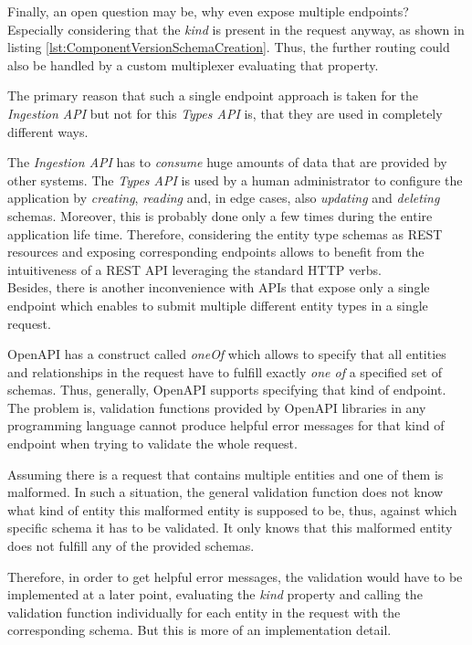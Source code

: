 Finally, an open question may be, why even expose multiple endpoints? Especially considering that the \emph{kind} is present in the request anyway, as shown in listing \ref{lst:ComponentVersionSchemaCreation}. Thus, the further routing could also be handled by a custom multiplexer evaluating that property.\par
The primary reason that such a single endpoint approach is taken for the \emph{Ingestion API} but not for this \emph{Types API} is, that they are used in completely different ways.\par
The \emph{Ingestion API} has to \emph{consume} huge amounts of data that are provided by other systems. The \emph{Types API} is used by a human administrator to configure the application by \emph{creating}, \emph{reading} and, in edge cases, also \emph{updating} and \emph{deleting} schemas. Moreover, this is probably done only a few times during the entire application life time. Therefore, considering the entity type schemas as REST resources and exposing corresponding endpoints allows to benefit from the intuitiveness of a REST API leveraging the standard HTTP verbs.\\

Besides, there is another inconvenience with APIs that expose only a single endpoint which enables to submit multiple different entity types in a single request.\par 
OpenAPI has a construct called \emph{oneOf} which allows to specify that all entities and relationships in the request have to fulfill exactly \emph{one of} a specified set of schemas. Thus, generally, OpenAPI supports specifying that kind of endpoint. The problem is, validation functions provided by OpenAPI libraries in any programming language cannot produce helpful error messages for that kind of endpoint when trying to validate the whole request.\par 
Assuming there is a request that contains multiple entities and one of them is malformed. In such a situation, the general validation function does not know what kind of entity this malformed entity is supposed to be, thus, against which specific schema it has to be validated. It only knows that this malformed entity does not fulfill any of the provided schemas.\par
Therefore, in order to get helpful error messages, the validation would have to be implemented at a later point, evaluating the \emph{kind} property and calling the validation function individually for each entity in the request with the corresponding schema. But this is more of an implementation detail.

